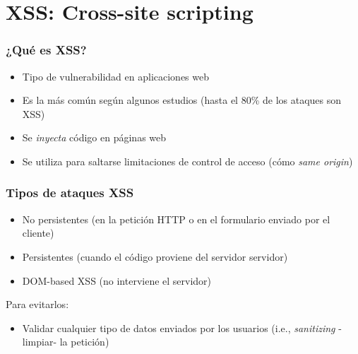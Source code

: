 \section{XSS: Cross-site scripting}


\begin{frame}
\frametitle{¿Qué es XSS?}

\begin{itemize}
   \item Tipo de vulnerabilidad en aplicaciones web
   \item Es la más común según algunos estudios (hasta el 80\% de los ataques son XSS)
   \item Se \emph{inyecta} código en páginas web 
   \item Se utiliza para saltarse limitaciones de control de acceso (cómo \emph{same origin})
\end{itemize}

\end{frame}


\begin{frame}
\frametitle{Tipos de ataques XSS}

\begin{itemize}
   \item No persistentes (en la petición HTTP o en el formulario enviado por el cliente)
   \item Persistentes (cuando el código proviene del servidor servidor)
   \item DOM-based XSS (no interviene el servidor)
\end{itemize}



Para evitarlos:

\begin{itemize}
  \item Validar cualquier tipo de datos enviados por los usuarios (i.e., \emph{sanitizing} -limpiar- la petición)
\end{itemize}

\end{frame}



